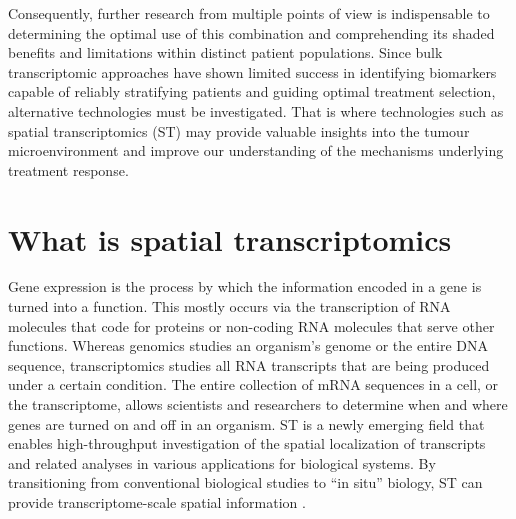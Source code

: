 Consequently, further research from multiple points of view is indispensable to determining the optimal use of this combination and comprehending its shaded benefits and limitations within distinct patient populations. Since bulk transcriptomic approaches have shown limited success in identifying biomarkers capable of reliably stratifying patients and guiding optimal treatment selection, alternative technologies must be investigated. That is where technologies such as spatial transcriptomics (ST) may provide valuable insights into the tumour microenvironment and improve our understanding of the mechanisms underlying treatment response.

\section{What is spatial transcriptomics}

Gene expression is the process by which the information encoded in a gene is turned into a function. This mostly occurs via the transcription of RNA molecules that code for proteins or non-coding RNA molecules that serve other functions\cite{NHGRI}. Whereas genomics studies an organism’s genome or the entire DNA sequence, transcriptomics studies all RNA transcripts that are being produced under a certain condition. The entire collection of mRNA sequences in a cell, or the transcriptome, allows scientists and researchers to determine when and where genes are turned on and off in an organism\cite{Dr.Cartwright}. ST is a newly emerging field that enables high-throughput investigation of the spatial localization of transcripts and related analyses in various applications for biological systems. By transitioning from conventional biological studies to “in situ” biology, ST can provide transcriptome-scale spatial information\cite{Han-Eol.Park} . 

